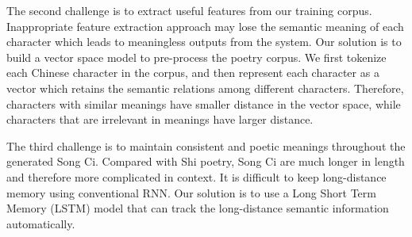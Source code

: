The second challenge is to extract useful features from our training corpus.
%
Inappropriate feature extraction approach may lose the semantic meaning of each character which leads to meaningless outputs from the system.
%
Our solution is to build a vector space model to pre-process the poetry corpus. We first tokenize each Chinese character in the corpus, and then represent each character as a vector which retains the semantic relations among different characters. Therefore, characters with similar meanings have smaller distance in the vector space, while characters that are irrelevant in meanings have larger distance.


The third challenge is to maintain consistent and poetic meanings throughout the generated Song Ci.
%
Compared with Shi poetry, Song Ci are much longer in length and therefore more complicated in context.
%
It is difficult to keep long-distance memory using conventional RNN.
%
Our solution is to use a Long Short Term Memory (LSTM) model that can track the long-distance semantic information automatically.
